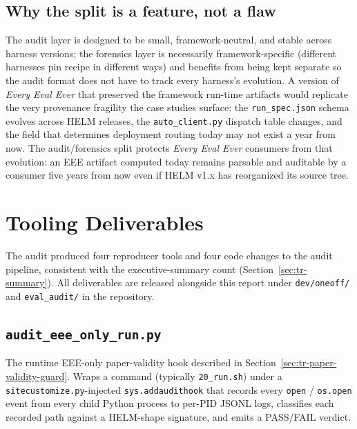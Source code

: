 \documentclass[11pt]{article}
\newcommand{\eee}{\textit{Every Eval Ever}\xspace}
\begin{document}
\subsection{Why the split is a feature, not a flaw}
\label{sec:tr-scope-feature}

The audit layer is designed to be small, framework-neutral, and
  stable across harness versions; the forensics layer is necessarily
  framework-specific (different harnesses pin recipe in different ways)
  and benefits from being kept separate so the audit format does not
  have to track every harness's evolution.
A version of \eee{} that preserved the framework run-time artifacts
  would replicate the very provenance fragility the case studies
  surface: the \texttt{run\_spec.json} schema evolves across HELM
  releases, the \texttt{auto\_client.py} dispatch table changes, and
  the field that determines deployment routing today may not exist a
  year from now.
The audit/forensics split protects \eee{} consumers from that
  evolution: an EEE artifact computed today remains parsable and
  auditable by a consumer five years from now even if HELM v1.x has
  reorganized its source tree.


\section{Tooling Deliverables}
\label{sec:tr-tooling}

The audit produced four reproducer tools and four code changes to the
  audit pipeline, consistent with the executive-summary count
  (Section~\ref{sec:tr-summary}).
All deliverables are released alongside this report under
  \texttt{dev/oneoff/} and \texttt{eval\_audit/} in the repository.

\subsection{\texorpdfstring{\texttt{audit\_eee\_only\_run.py}}{audit\_eee\_only\_run.py}}
\label{sec:tr-tooling-audit-hook}

The runtime EEE-only paper-validity hook described in
  Section~\ref{sec:tr-paper-validity-guard}.
Wraps a command (typically \texttt{20\_run.sh}) under a
  \texttt{sitecustomize.py}-injected \texttt{sys.addaudithook} that
  records every \texttt{open} / \texttt{os.open} event from every
  child Python process to per-PID JSONL logs, classifies each
  recorded path against a HELM-shape signature, and emits a
  PASS/FAIL verdict.
\end{document}
